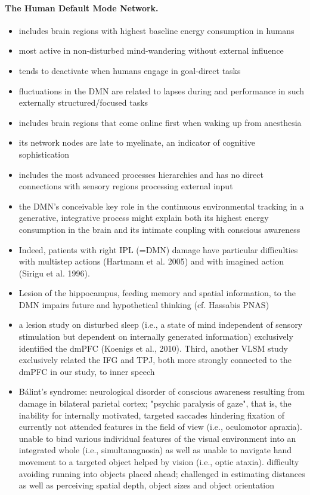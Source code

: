 \documentclass{article} %
\begin{document}
\paragraph{The Human Default Mode Network.}
\begin{itemize}
  \item includes brain regions with highest baseline energy consumption in humans
  \item most active in non-disturbed mind-wandering without external influence
  \item tends to deactivate when humans engage in goal-direct tasks
  \item fluctuations in the DMN are related to lapses during and performance in
  such externally structured/focused tasks
  \item includes brain regions that come online first when waking up from
  anesthesia
  \item its network nodes are late to myelinate, an indicator of cognitive sophistication
  \item includes the most advanced processes hierarchies and has
  no direct connections with sensory regions processing external input
  \item the DMN's conceivable key role in the continuous environmental
  tracking in a generative, integrative process might explain both its highest energy consumption in the brain and its intimate coupling with conscious awareness
  \item Indeed, patients with right IPL (=DMN) damage have particular difficulties
  with multistep actions (Hartmann et al. 2005)
  and with imagined action (Sirigu et al. 1996).
  \item Lesion of the hippocampus, feeding memory and spatial information, to the
  DMN impairs future and hypothetical thinking (cf. Hassabis PNAS)
  \item a lesion study on disturbed sleep (i.e., a state of mind
  independent of sensory stimulation but dependent on
  internally generated information) exclusively identified
  the dmPFC (Koenigs et al., 2010). Third, another VLSM study exclusively
  related the IFG and TPJ, both more strongly connected to the
  dmPFC in our study, to inner speech
  \item Bálint's syndrome: neurological disorder of conscious
  awareness resulting from damage in bilateral parietal cortex;
  "psychic paralysis of gaze", that is, the inability for internally
  motivated, targeted saccades hindering fixation of currently not
  attended features in the field of view (i.e., oculomotor apraxia).
  unable to bind various individual features of the visual
  environment into an integrated whole (i.e., simultanagnosia)
  as well as unable to navigate hand movement to a targeted
  object helped by vision (i.e., optic ataxia).
  difficulty avoiding running into objects placed ahead;
  challenged in estimating distances as well as perceiving
  spatial depth, object sizes and object orientation
\end{itemize}
\end{document}
